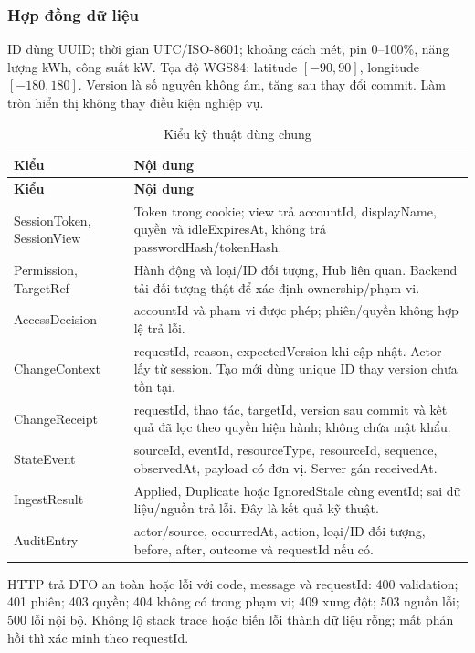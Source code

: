 \subsubsection{Hợp đồng dữ liệu}
ID dùng UUID; thời gian UTC/ISO-8601; khoảng cách mét, pin 0--100\%, năng lượng kWh, công suất kW. Tọa độ WGS84: latitude $[-90,90]$, longitude $[-180,180]$. Version là số nguyên không âm, tăng sau thay đổi commit. Làm tròn hiển thị không thay điều kiện nghiệp vụ.

\begin{longtable}{|L{35mm}|L{104mm}|}
\caption{Kiểu kỹ thuật dùng chung}\\\hline
\textbf{Kiểu} & \textbf{Nội dung}\\\hline
\endfirsthead
\hline\textbf{Kiểu} & \textbf{Nội dung}\\\hline\endhead
SessionToken, SessionView & Token trong cookie; view trả accountId, displayName, quyền và idleExpiresAt, không trả passwordHash/tokenHash.\\\hline
Permission, TargetRef & Hành động và loại/ID đối tượng, Hub liên quan. Backend tải đối tượng thật để xác định ownership/phạm vi.\\\hline
AccessDecision & accountId và phạm vi được phép; phiên/quyền không hợp lệ trả lỗi.\\\hline
ChangeContext & requestId, reason, expectedVersion khi cập nhật. Actor lấy từ session. Tạo mới dùng unique ID thay version chưa tồn tại.\\\hline
ChangeReceipt & requestId, thao tác, targetId, version sau commit và kết quả đã lọc theo quyền hiện hành; không chứa mật khẩu.\\\hline
StateEvent & sourceId, eventId, resourceType, resourceId, sequence, observedAt, payload có đơn vị. Server gán receivedAt.\\\hline
IngestResult & Applied, Duplicate hoặc IgnoredStale cùng eventId; sai dữ liệu/nguồn trả lỗi. Đây là kết quả kỹ thuật.\\\hline
AuditEntry & actor/source, occurredAt, action, loại/ID đối tượng, before, after, outcome và requestId nếu có.\\\hline
\end{longtable}

HTTP trả DTO an toàn hoặc lỗi với code, message và requestId: 400 validation; 401 phiên; 403 quyền; 404 không có trong phạm vi; 409 xung đột; 503 nguồn lỗi; 500 lỗi nội bộ. Không lộ stack trace hoặc biến lỗi thành dữ liệu rỗng; mất phản hồi thì xác minh theo requestId.
